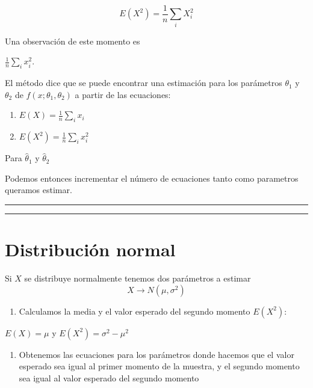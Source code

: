 \documentclass[
]{book}
\providecommand{\tightlist}{%
  \setlength{\itemsep}{0pt}\setlength{\parskip}{0pt}}
\begin{document}
\[E(X^2)=\frac{1}{n}\sum_i X^2_i\]

Una observación de este momento es

\(\frac{1}{n}\sum_i x^2_i\).

El método dice que se puede encontrar una estimación para los parámetros \(\theta_1\) y \(\theta_2\) de \(f(x;\theta_1,\theta_2)\) a partir de las ecuaciones:

\begin{enumerate}
\def\labelenumi{\alph{enumi}.}
\item
  \(E(X)= \frac{1}{n}\sum_i x_i\)
\item
  \(E(X^2)=\frac{1}{n}\sum_i x^2_i\)
\end{enumerate}

Para \(\hat{\theta}_1\) y \(\hat{\theta}_2\)

Podemos entonces incrementar el número de ecuaciones tanto como parametros queramos estimar.

\begin{center}\rule{0.5\linewidth}{0.5pt}\end{center}

\begin{center}\rule{0.5\linewidth}{0.5pt}\end{center}

\hypertarget{distribuciuxf3n-normal-13}{%
\section{Distribución normal}\label{distribuciuxf3n-normal-13}}

Si \(X\) se distribuye normalmente tenemos dos parámetros a estimar
\[X \rightarrow N(\mu, \sigma^2)\]

\begin{enumerate}
\def\labelenumi{\arabic{enumi}.}
\tightlist
\item
  Calculamos la media y el valor esperado del segundo momento \(E(X^2)\):
\end{enumerate}

\(E(X)=\mu\) y
\(E(X^2)=\sigma^2-\mu^2\)

\begin{enumerate}
\def\labelenumi{\arabic{enumi}.}
\setcounter{enumi}{1}
\tightlist
\item
  Obtenemos las ecuaciones para los parámetros donde hacemos que el valor esperado sea igual al primer momento de la muestra, y el segundo momento sea igual al valor esperado del segundo momento
\end{enumerate}
\end{document}
